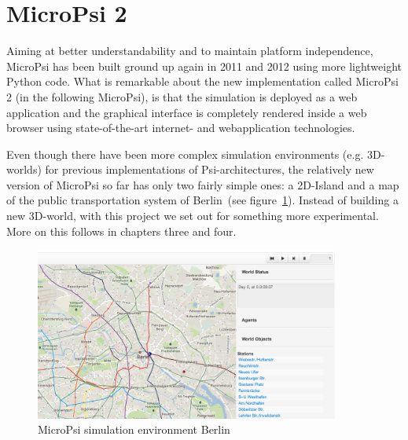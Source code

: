     \section{MicroPsi 2}
Aiming at better understandability and to maintain platform independence, MicroPsi has been built ground up again in 2011 and 2012 using more lightweight Python code. What is remarkable about the new implementation called MicroPsi 2 (in the following MicroPsi), is that the simulation is deployed as a web application and the graphical interface is completely rendered inside a web browser using state-of-the-art internet- and webapplication technologies.~\cite{conf/agi/Bach12}
        
Even though there have been more complex simulation environments (e.g. 3D-worlds) for previous implementations of Psi-architectures, the relatively new version of MicroPsi so far has only two fairly simple ones: a 2D-Island and a map of the public transportation system of Berlin~(see figure~\ref{mp2_berlin}). Instead of building a new 3D-world, with this project we set out for something more experimental. More on this follows in chapters three and four.

\begin{figure}[h]
  \centering
    \includegraphics[width=10cm]{graphics/mp2_berlin}
  \caption{MicroPsi simulation environment Berlin}
  \label{mp2_berlin}
\end{figure}

